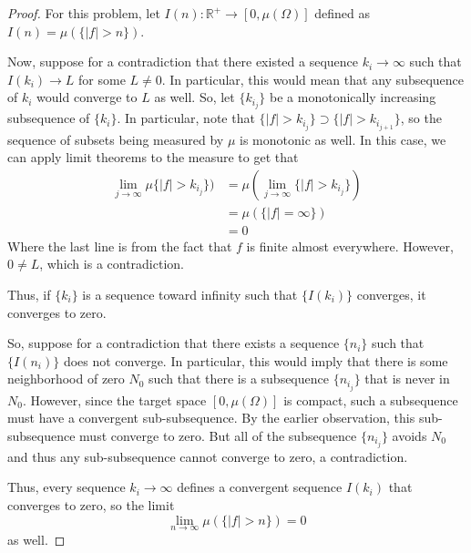 \documentclass[fontsize=11pt]{scrartcl} %
\numberwithin{equation}{section} %
\numberwithin{figure}{section} %
\numberwithin{table}{section} %
\newcommand{\R}{\mathbb{R}}
\begin{document}
\begin{proof}
For this problem, let $I(n): \R^{+}\to [0,\mu(\Omega)]$ defined as $I(n) = \mu(\{|f|>n\})$.

Now, suppose for a contradiction that there existed a sequence $k_i\to\infty$ such that
$I(k_i)\to L$ for some $L\neq 0$. In particular, this would mean that any subsequence
of $k_i$ would converge to $L$ as well. So, let $\{k_{i_j}\}$ be a monotonically increasing
subsequence of $\{k_i\}$. In particular, note that $\{|f| > k_{i_j}\}\supset\{|f| > k_{i_{j+1}}\}$,
so the sequence of subsets being measured by $\mu$ is monotonic as well. In this case,
we can apply limit theorems to the measure to get that
\[
\begin{aligned}
\lim_{j\to\infty} \mu\{|f| > k_{i_j}\}) &= \mu\left(\lim_{j\to\infty} \{|f| > k_{i_j}\}\right)\\
                                        &= \mu(\{|f| = \infty\})\\
                                        &= 0
\end{aligned}
\]
Where the last line is from the fact that $f$ is finite almost everywhere.
However, $0\neq L$, which is a contradiction.

Thus, if $\{k_i\}$ is a sequence toward infinity such that $\{I(k_i)\}$ converges, it converges
to zero.

So, suppose for a contradiction that there exists a sequence $\{n_i\}$ such that $\{I(n_i)\}$
does not converge. In particular, this would imply that there is some neighborhood of zero $N_0$
such that there is a subsequence $\{n_{i_j}\}$ that is never in $N_0$. However,
since the target space $[0,\mu(\Omega)]$ is compact, such a subsequence must have a convergent
sub-subsequence. By the earlier observation, this sub-subsequence must converge to zero. But 
all of the subsequence $\{n_{i_j}\}$ avoids $N_0$ and thus any sub-subsequence cannot converge
to zero, a contradiction.

Thus, every sequence $k_i\to\infty$ defines a convergent sequence $I(k_i)$ that converges
to zero, so the limit 
\[
\lim_{n\to\infty} \mu(\{|f|> n\}) = 0
\]
as well.
\end{proof}

\end{document}
